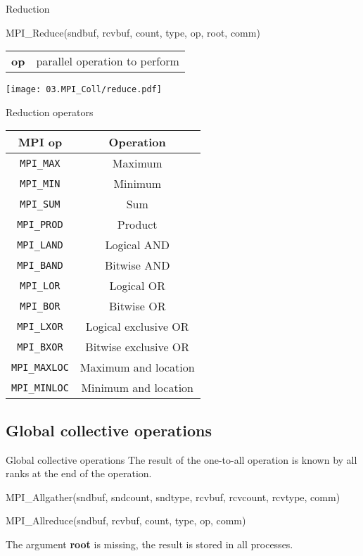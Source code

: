\documentclass[aspectratio=43]{beamer}
\begin{document}
\begin{frame}[fragile]{Reduction}
\begin{Pseudolisting}[]{}
MPI_Reduce(sndbuf, rcvbuf, count, type, op, root, comm)
\end{Pseudolisting}
\begin{black1block}{}
\begin{tabular}{rp{8cm}}
\textbf{op} & parallel operation to perform\\
\end{tabular}
\end{black1block}
\begin{center}
\texttt{[image: 03.MPI\_Coll/reduce.pdf]}
\end{center}
\end{frame}

\begin{frame}[fragile]{Reduction operators}
\begin{center}
\begin{tabular}{|c||c|}
    \hline
    \color{cscsblue}\textbf{MPI op} & \color{cscsbrown}\textbf{Operation} \\\hline\hline
    \verb+MPI_MAX+ & Maximum\\\hline
    \verb+MPI_MIN+ & Minimum\\\hline
    \verb+MPI_SUM+ & Sum\\\hline
    \verb+MPI_PROD+ & Product\\\hline
    \verb+MPI_LAND+ & Logical AND\\\hline
    \verb+MPI_BAND+ & Bitwise AND\\\hline
    \verb+MPI_LOR+ & Logical OR\\\hline
    \verb+MPI_BOR+ & Bitwise OR\\\hline
    \verb+MPI_LXOR+ & Logical exclusive OR\\\hline
    \verb+MPI_BXOR+ & Bitwise exclusive OR\\\hline
    \verb+MPI_MAXLOC+ & Maximum and location\\\hline
    \verb+MPI_MINLOC+ & Minimum and location\\\hline
\end{tabular}
\end{center}
\end{frame}

\subsection{Global collective operations}
\begin{frame}[fragile]{Global collective operations}
The result of the one-to-all operation is known by all ranks at the end of the operation.
\begin{Pseudolisting}[]{}
MPI_Allgather(sndbuf, sndcount, sndtype,
              rcvbuf, rcvcount, rcvtype, comm)

MPI_Allreduce(sndbuf, rcvbuf, count, type, op, comm)
\end{Pseudolisting}
The argument \textbf{root} is missing, the result is stored in all processes.\\
\end{frame}
\end{document}
